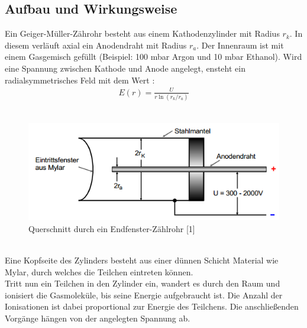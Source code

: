 \subsection{Aufbau und Wirkungsweise}
Ein Geiger-Müller-Zährohr besteht aus einem Kathodenzylinder mit Radius $r_{k}$. In diesem verläuft axial ein Anodendraht mit Radius $r_{a}$. Der Innenraum ist mit einem Gasgemisch gefüllt (Beispiel: 100 mbar Argon und 10 mbar Ethanol). Wird eine Spannung zwischen Kathode und Anode angelegt, ensteht ein radialsymmetrisches Feld mit dem Wert :\\
\begin{align}
E(r)=\frac{U}{r \ln(r_{k}/r_{a})}
\label{1}
\end{align}\\
	\begin{figure}[h]
		\begin{center}
		\includegraphics[scale=1.0]{Querschnitt.png}
		\caption{Querschnitt durch ein Endfenster-Zählrohr [1]}
		\label{Quer}
		\end{center}	
	\end{figure}\\
Eine Kopfseite des Zylinders besteht aus einer dünnen Schicht Material wie Mylar, durch welches die Teilchen eintreten können.\\
Tritt nun ein Teilchen in den Zylinder ein, wandert es durch den Raum und ionisiert die Gasmoleküle, bis seine Energie aufgebraucht ist. Die Anzahl der Ionisationen ist dabei proportional zur Energie des Teilchens. Die anschließenden Vorgänge hängen von der angelegten Spannung ab.
